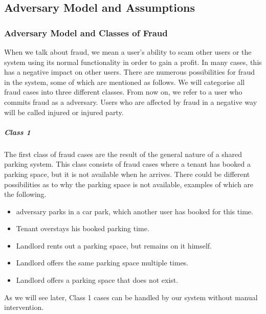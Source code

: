 \documentclass[
a4paper,     %
titlepage,   %
14pt         %
]{scrartcl}  %
\theoremstyle{mystyle}
\begin{document}
\subsection{Adversary Model and Assumptions}

\subsubsection{Adversary Model and Classes of Fraud}
When we talk about fraud, we mean a user's ability to scam other users or the system using its normal functionality in order to gain a profit. In many cases, this has a negative impact on other users. There are numerous possibilities for fraud in the system, some of which are mentioned as follows. We will categorise all fraud cases into three different classes. From now on, we refer to a user who commits fraud as a adversary. Users who are affected by fraud in a negative way will be called injured or injured party. \\

\subparagraph{Class 1} The first class of fraud cases are the result of the general nature of a shared parking system. This class consists of fraud cases where a tenant has booked a parking space, but it is not available when he arrives. There could be different possibilities as to why the parking space is not available, examples of which are the following.
\begin{itemize}
\item adversary parks in a car park, which another user has booked for this time.
\item Tenant overstays his booked parking time.
\item Landlord rents out a parking space, but remains on it himself.
\item Landlord offers the same parking space multiple times.
\item Landlord offers a parking space that does not exist.
\end{itemize}
As we will see later, Class 1 cases can be handled by our system without manual intervention. 
\end{document}
